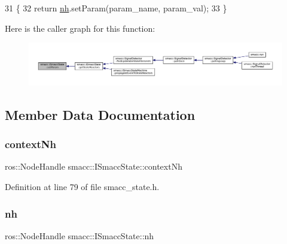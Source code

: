\begin{DoxyCode}
31 \{
32     \textcolor{keywordflow}{return} \hyperlink{classsmacc_1_1ISmaccState_a13fe6e6abfdb87996402189d44b78494}{nh}.setParam(param\_name, param\_val);
33 \}
\end{DoxyCode}
Here is the caller graph for this function\+:
\nopagebreak
\begin{figure}[H]
\begin{center}
\leavevmode
\includegraphics[width=350pt]{classsmacc_1_1ISmaccState_a0b6c531ca8c446052022308548f55b92_icgraph}
\end{center}
\end{figure}


\subsection{Member Data Documentation}
\mbox{\label{classsmacc_1_1ISmaccState_ae59191a663a08489b7d10036f3b25238}} 
\subsubsection{\texorpdfstring{context\+Nh}{contextNh}}
{\footnotesize\ttfamily ros\+::\+Node\+Handle smacc\+::\+I\+Smacc\+State\+::context\+Nh\hspace{0.3cm}{\ttfamily [protected]}}



Definition at line 79 of file smacc\+\_\+state.\+h.

\mbox{\label{classsmacc_1_1ISmaccState_a13fe6e6abfdb87996402189d44b78494}} 
\subsubsection{\texorpdfstring{nh}{nh}}
{\footnotesize\ttfamily ros\+::\+Node\+Handle smacc\+::\+I\+Smacc\+State\+::nh\hspace{0.3cm}{\ttfamily [protected]}}




